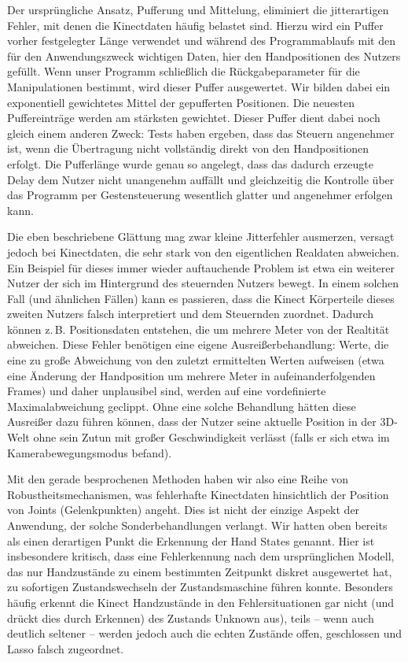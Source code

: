 	Der ursprüngliche Ansatz, Pufferung und Mittelung, eliminiert die jitterartigen Fehler, mit denen die Kinectdaten häufig belastet sind. Hierzu wird ein Puffer vorher festgelegter Länge verwendet und während des Programmablaufs mit den für den Anwendungszweck wichtigen Daten, hier den Handpositionen des Nutzers gefüllt. Wenn unser Programm schließlich die Rückgabeparameter für die Manipulationen bestimmt, wird dieser Puffer ausgewertet. Wir bilden dabei ein exponentiell gewichtetes Mittel der gepufferten Positionen. Die neuesten Puffereinträge werden am stärksten gewichtet. Dieser Puffer dient dabei noch gleich einem anderen Zweck: Tests haben ergeben, dass das Steuern angenehmer ist, wenn die Übertragung nicht vollständig direkt von den Handpositionen erfolgt. Die Pufferlänge wurde genau so angelegt, dass das dadurch erzeugte Delay dem Nutzer nicht unangenehm auffällt und gleichzeitig die Kontrolle über das Programm per Gestensteuerung wesentlich glatter und angenehmer erfolgen kann.\par 
	Die eben beschriebene Glättung mag zwar kleine Jitterfehler ausmerzen, versagt jedoch bei Kinectdaten, die sehr stark von den eigentlichen Realdaten abweichen. Ein Beispiel für dieses immer wieder auftauchende Problem ist etwa ein weiterer Nutzer der sich im Hintergrund des steuernden Nutzers bewegt. In einem solchen Fall (und ähnlichen Fällen) kann es passieren, dass die Kinect Körperteile dieses zweiten Nutzers falsch interpretiert und dem Steuernden zuordnet. Dadurch können z.\,B. Positionsdaten entstehen, die um mehrere Meter von der Realtität abweichen. Diese Fehler benötigen eine eigene Ausreißerbehandlung: Werte, die eine zu große Abweichung von den zuletzt ermittelten Werten aufweisen (etwa eine Änderung der Handposition um mehrere Meter in aufeinanderfolgenden Frames) und daher unplausibel sind, werden auf eine vordefinierte Maximalabweichung geclippt. Ohne eine solche Behandlung hätten diese Ausreißer dazu führen können, dass der Nutzer seine aktuelle Position in der 3D-Welt ohne sein Zutun mit großer Geschwindigkeit verlässt (falls er sich etwa im Kamerabewegungsmodus befand).\par 
	Mit den gerade besprochenen Methoden haben wir also eine Reihe von Robustheitsmechanismen, was fehlerhafte Kinectdaten hinsichtlich der Position von Joints (Gelenkpunkten) angeht. Dies ist nicht der einzige Aspekt der Anwendung, der solche Sonderbehandlungen verlangt. Wir hatten oben bereits als einen derartigen Punkt die Erkennung der \glqq Hand States\grqq{} genannt. Hier ist insbesondere kritisch, dass eine Fehlerkennung nach dem ursprünglichen Modell, das nur Handzustände zu einem bestimmten Zeitpunkt diskret ausgewertet hat, zu sofortigen Zustandswechseln der Zustandsmaschine führen konnte. Besonders häufig erkennt die Kinect Handzustände in den Fehlersituationen gar nicht (und drückt dies durch \glqq Erkennen\grqq{}) des Zustands \glqq{}Unknown\grqq{} aus), teils -- wenn auch deutlich seltener -- werden jedoch auch die \glqq echten\grqq{} Zustände \glqq offen\grqq{}, \glqq geschlossen\grqq{} und \glqq Lasso\grqq{} falsch zugeordnet.\par 
